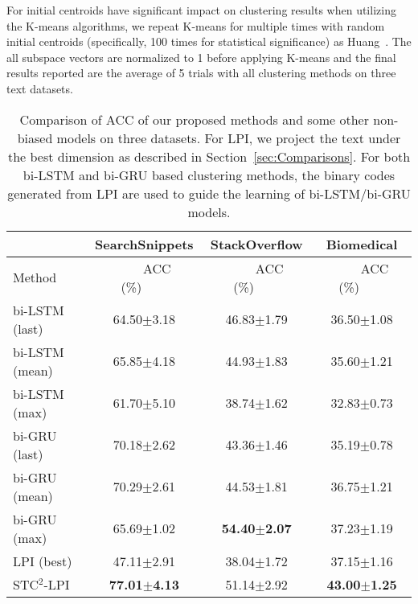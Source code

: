 \documentclass[review]{elsarticle}
\begin{document}
For initial centroids have significant impact on clustering results when utilizing the K-means algorithms, we repeat K-means for multiple times with random initial centroids (specifically, 100 times for statistical significance) as Huang~\cite{1_huang2014deep}. The all subspace vectors are normalized to 1 before applying K-means and the final results reported are the average of 5 trials with all clustering methods on three text datasets.

\begin{table*}[t] %
\begin{center}
\begin{tabular}{|l|c|c|c|}\hline
&SearchSnippets &StackOverflow &Biomedical\\\hline
Method     &~~~~ACC (\%)~~~~&~~~~ACC (\%)~~~~&~~~~ACC (\%)~~~~\\\hline \hline
bi-LSTM (last)& 64.50$\pm$3.18        & 46.83$\pm$1.79  & 36.50$\pm$1.08    \\
bi-LSTM (mean)& 65.85$\pm$4.18    & 44.93$\pm$1.83  & 35.60$\pm$1.21 \\
bi-LSTM (max) & 61.70$\pm$5.10     	&38.74$\pm$1.62	  &32.83$\pm$0.73\\
bi-GRU (last)& 70.18$\pm$2.62        & 43.36$\pm$1.46  & 35.19$\pm$0.78    \\
bi-GRU (mean)& 70.29$\pm$2.61    & 44.53$\pm$1.81  & 36.75$\pm$1.21 \\
bi-GRU (max) & 65.69$\pm$1.02     &	{\bf{54.40$\pm$2.07}}	  &37.23$\pm$1.19\\
\hline
LPI (best)& 47.11$\pm$2.91	& 38.04$\pm$1.72  &37.15$\pm$1.16\\
STC$^2$-LPI& {\bf{77.01$\pm$4.13}}	& 51.14$\pm$2.92	&{\bf{43.00$\pm$1.25}}\\\hline

\end{tabular}
\end{center}
\caption{\label{tb:Comparison_BIRNN} Comparison of ACC of our proposed methods and some other non-biased models on three datasets. For LPI, we project the text under the best dimension as described in Section~\ref{sec:Comparisons}. For both bi-LSTM and bi-GRU based clustering methods, the binary codes generated from LPI are used to guide the learning of bi-LSTM/bi-GRU models.}
\end{table*}
\end{document}
